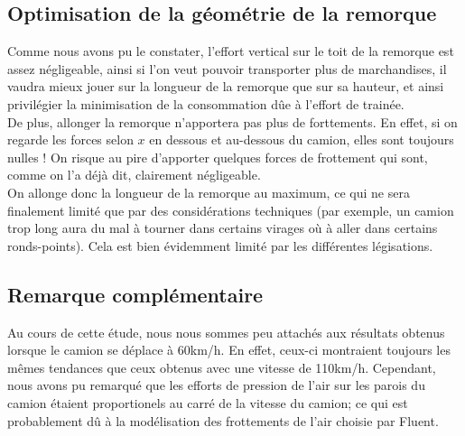 \subsection{Optimisation de la géométrie de la remorque}
Comme nous avons pu le constater, l'effort vertical sur le toit de la remorque est assez négligeable, ainsi si l'on veut pouvoir transporter plus de marchandises, il vaudra mieux jouer sur la longueur de la remorque que sur sa hauteur, et ainsi privilégier la minimisation de la consommation dûe à l'effort de trainée.\\
De plus, allonger la remorque n'apportera pas plus de forttements. En effet, si on regarde les forces selon $x$ en dessous et au-dessous du camion, elles sont toujours nulles ! On risque au pire d'apporter quelques forces de frottement qui sont, comme on l'a déjà dit, clairement négligeable.\\
On allonge donc la longueur de la remorque au maximum, ce qui ne sera finalement limité que par des considérations techniques (par exemple, un camion trop long aura du mal à tourner dans certains virages où à aller dans certains ronds-points). Cela est bien évidemment limité par les différentes légisations.

\subsection{Remarque complémentaire}
Au cours de cette étude, nous nous sommes peu attachés aux résultats obtenus lorsque le camion se déplace à 60km/h. En effet, ceux-ci montraient toujours les mêmes tendances que ceux obtenus avec une vitesse de 110km/h. Cependant, nous avons pu remarqué que les efforts de pression de l'air sur les parois du camion étaient proportionels au carré de la vitesse du camion; ce qui est probablement dû à la modélisation des frottements de l'air choisie par Fluent.

